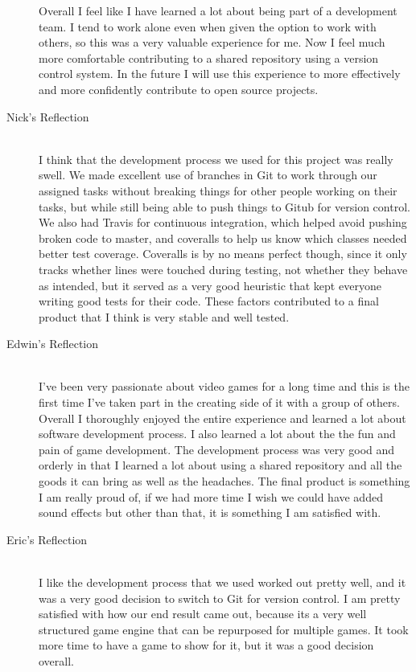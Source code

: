 \documentclass{article}
\begin{document}
\begin{description}
			Overall I feel like I have learned a lot about being part of a development 
			team. I tend to work alone even when given the option to work with others, 
			so this was a very valuable experience for me. Now I feel much more comfortable 
			contributing to a shared repository using a version control system. In the future 
			I will use this experience to more effectively and more confidently contribute to 
			open source projects.

			\item[Nick's Reflection] \hfill \\
			I think that the development process we used for this project was
			really swell. We made excellent use of branches in Git to work through
			our assigned tasks without breaking things for other people working on
			their tasks, but while still being able to push things to Gitub for
			version control. We also had Travis for continuous integration, which
			helped avoid pushing broken code to master, and coveralls to help us
			know which classes needed better test coverage. Coveralls is by no means
			perfect though, since it only tracks whether lines were touched during
			testing, not whether they behave as intended, but it served as a very
			good heuristic that kept everyone writing good tests for their code.
			These factors contributed to a final product that I think is very stable
			and well tested.

			\item[Edwin's Reflection] \hfill \\
			I've been very passionate about video games for a long time and this
			is the first time I've taken part in the creating side of it with a group of
			others. Overall I thoroughly enjoyed the entire experience and learned a lot
			about software development process. I also learned a lot about the the fun
			and pain of game development. The development process was very good
			and orderly in that I learned a lot about using a shared repository and all the
			goods it can bring as well as the headaches. The final product is something
			I am really proud of, if we had more time I wish we could have added
			sound effects but other than that, it is something I am satisfied with.

			\item[Eric's Reflection] \hfill \\
			I like the development process that we used worked out pretty well,
			and it was a very good decision to switch to Git for version control. I
			am pretty satisfied with how our end result came out, because its
			a very well structured game engine that can be repurposed for multiple
			games. It took more time to have a game to show for it, but it was a
			good decision overall.


\end{description}
\end{document}
